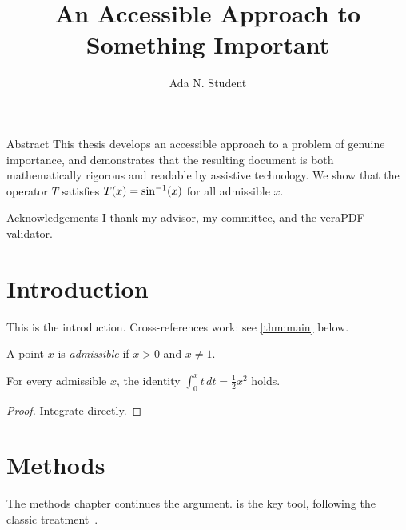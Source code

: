 \documentclass{thesis}
\title{An Accessible Approach to Something Important}
\author{Ada N. Student}
\begin{document}
\makeUNRtitlepage
\makecopyrightpage
\committeeapprovalpage

\frontmatter

\begin{frontmatterpage}{Abstract}
This thesis develops an accessible approach to a problem of genuine importance,
and demonstrates that the resulting document is both mathematically rigorous and
readable by assistive technology. We show that the operator $T$ satisfies
$T(x) = \ThesisMathIntent{inverse-sine}{\sin^{-1}}(x)$ for all admissible $x$.
\end{frontmatterpage}

\begin{frontmatterpage}{Acknowledgements}
I thank my advisor, my committee, and the veraPDF validator.
\end{frontmatterpage}

\tableofcontents
\listoftables
\listoffigures

\mainmatter

\chapter{Introduction}
This is the introduction. Cross-references work: see \cref{thm:main} below.

\begin{definition}[Admissible]
A point $x$ is \emph{admissible} if $x > 0$ and $x \neq 1$.
\end{definition}

\begin{theorem}\label{thm:main}
For every admissible $x$, the identity $\int_0^x t \, dt = \tfrac{1}{2}x^2$ holds.
\end{theorem}

\begin{proof}
Integrate directly.
\end{proof}

\chapter{Methods}
The methods chapter continues the argument.  is the key tool,
following the classic treatment~\autocite{rudin1976}.
\end{document}
